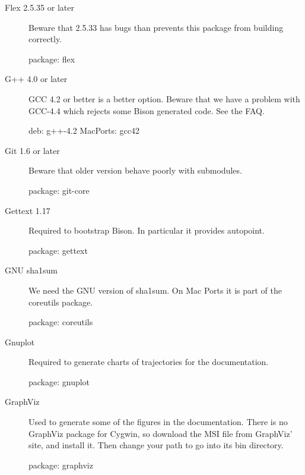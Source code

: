 \begin{description}
\item[Flex 2.5.35 or later]
  Beware that 2.5.33 has bugs than prevents this package from building
  correctly.
\begin{package}
package: flex
\end{package}

\item[G++ 4.0 or later]
  GCC 4.2 or better is a better option.  Beware that we have a problem
  with GCC-4.4 which rejects some Bison generated code.  See the FAQ.
\begin{package}
deb: g++-4.2
MacPorts: gcc42
\end{package}

\item[Git 1.6 or later]
  Beware that older version behave poorly with submodules.
\begin{package}
package: git-core
\end{package}

\item[Gettext 1.17]
  Required to bootstrap Bison.  In particular it provides autopoint.
\begin{package}
package: gettext
\end{package}

\item[GNU sha1sum]
  We need the GNU version of sha1sum.  On Mac Ports it is part of the
  coreutils package.
\begin{package}
package: coreutils
\end{package}

\item[Gnuplot]
  Required to generate charts of trajectories for the documentation.
\begin{package}
package: gnuplot
\end{package}

\item[GraphViz] Used to generate some of the figures in the
  documentation.  There is no GraphViz package for Cygwin, so download
  the MSI file from GraphViz' site, and install it.  Then change your
  path to go into its bin directory.


\begin{package}
package: graphviz
\end{package}


\end{description}
